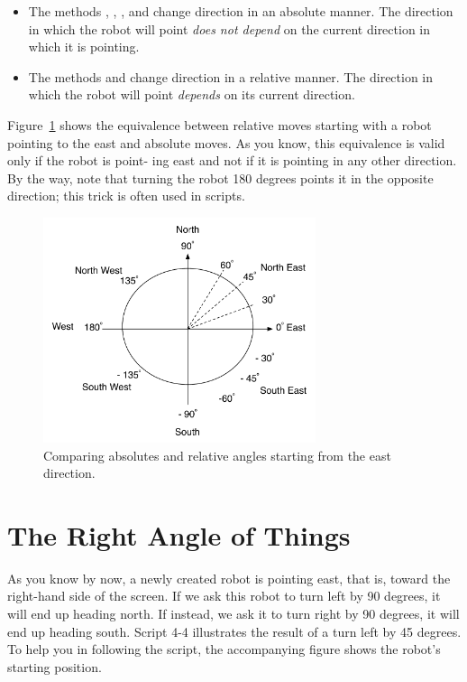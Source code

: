 \documentclass[a4paper,10pt,twoside]{book}
\begin{document}
\begin{itemize}
\item The methods , , , and  change direction in an absolute manner. 
The direction in which the robot will point \emph{does not depend} on the current direction in 
which it is pointing. 
\item  The methods and  change direction in a relative manner. The 
direction in which the robot will point \emph{depends} on its current direction. 
\end{itemize}

Figure~\ref{fig:roserelative} shows the equivalence between relative moves starting with a robot pointing to 
the east and absolute moves. As you know, this equivalence is valid only if the robot is point- 
ing east and not if it is pointing in any other direction. By the way, note that turning the robot 
180 degrees points it in the opposite direction; this trick is often used in scripts. 


\begin{figure}[h]
\begin{center}\includegraphics[width=8cm]{roseDesVentsRelatifToo}
\caption{Comparing absolutes and relative angles starting from the east direction.\label{fig:roserelative}}
\end{center}
\end{figure}

\section{The Right Angle of Things}

As you know by now, a newly created robot is pointing east, that is, toward the right-hand side 
of the screen. If we ask this robot to turn left by 90 degrees, it will end up heading north. If 
instead, we ask it to turn right by 90 degrees, it will end up heading south. Script 4-4 illustrates 
the result of a turn left by 45 degrees. To help you in following the script, the accompanying 
figure shows the robot’s starting position. 
\end{document}

